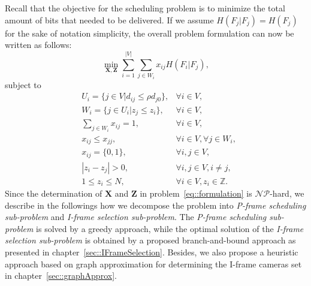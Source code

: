 Recall that the objective for the scheduling problem is to minimize the total amount of bits that needed to be delivered.
If we assume $H(F_j|F_j) = H(F_j)$ for the sake of notation simplicity, the overall problem formulation can now be written as follows:
\begin{equation*}
\underset{\mathbf{X}, \mathbf{Z}}{\min}
\sum_{i=1}^{|V|} \sum_{j \in W_i}  x_{ij} H(F_i|F_j),
\end{equation*}
subject to
\begin{align}
&U_i = \{ j \in V | d_{ij} \leq \rho d_{j0} \}, &\forall i \in V, \nonumber \\
&W_i = \{ j \in U_i | z_j \leq z_i \}, &\forall i \in V, \nonumber \\
&\sum_{j \in W_i} x_{ij} = 1, &\forall i \in V, \nonumber \\
&x_{ij} \leq x_{jj}, &\forall i \in V, \forall j \in W_i, \nonumber \\
&x_{ij} = \{0,1\}, &\forall i,j \in V, \nonumber \\
&|z_i - z_j| > 0, &\forall i,j \in V, i \neq j, \nonumber \\
&1 \leq z_i \leq N, &\forall i \in V, z_i \in \mathbb{Z}.
\label{eq::formulation}
\end{align}
Since the determination of $\mathbf{X}$ and $\mathbf{Z}$ in problem~\eqref{eq::formulation} is $\mathcal{NP}$-hard, we describe in the followings how we decompose the problem into \emph{P-frame scheduling sub-problem} and \emph{I-frame selection sub-problem}.
The \emph{P-frame scheduling sub-problem} is solved by a greedy approach, while the optimal solution of the \emph{I-frame selection sub-problem} is obtained by a proposed branch-and-bound approach as presented in chapter~\ref{sec::IFrameSelection}.
Besides, we also propose a heuristic approach based on graph approximation for determining the I-frame cameras set in chapter~\ref{sec::graphApprox}.
%
